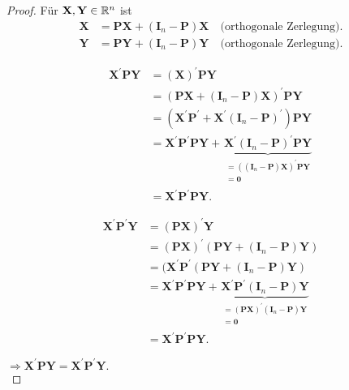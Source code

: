 \documentclass{tstextbook}
\begin{document}
\begin{proof}
	Für $ \mathbf{X},\mathbf{Y} \in \mathbb R^n $ ist 
	\[ \begin{aligned}
		\mathbf{X} & = \mathbf{P}\mathbf{X} + (\mathbf{I}_n - \mathbf{P})\mathbf{X} \quad \text{(orthogonale Zerlegung).} \\
		\mathbf{Y} & = \mathbf{P}\mathbf{Y} + (\mathbf{I}_n - \mathbf{P})\mathbf{Y} \quad \text{(orthogonale Zerlegung).}
	\end{aligned}	
	\]
	
	\[
	\begin{aligned}
		\mathbf{X}^\prime \mathbf{P}\mathbf{Y} & = (\mathbf{X})^\prime \mathbf{P}\mathbf{Y} \\
		& = (\mathbf{PX}+(\mathbf{I}_n-\mathbf{P})\mathbf{X})^\prime \mathbf{P}\mathbf{Y} \\
		& = (\mathbf{X}^\prime \mathbf{P}^\prime +\mathbf{X}^\prime(\mathbf{I}_n-\mathbf{P})^\prime)\mathbf{P}\mathbf{Y} \\
		& = \mathbf{X}^\prime \mathbf{P}^\prime \mathbf{P}\mathbf{Y} + \underbrace{\mathbf{X}^\prime (\mathbf{I}_n-\mathbf{P})^\prime \mathbf{PY}}_{\substack{=((\mathbf{I}_n-\mathbf{P})\mathbf{X})^\prime \mathbf{PY} \\ = \boldsymbol{0}}} \\
		& = \mathbf{X}^\prime \mathbf{P}^\prime \mathbf{PY}.
	\end{aligned}
	\]
	
	\[
	\begin{aligned}
		\mathbf{X}^\prime \mathbf{P}^\prime \mathbf{Y} & = (\mathbf{P}\mathbf{X})^\prime \mathbf{Y} \\
		& = (\mathbf{P}\mathbf{X})^\prime (\mathbf{P}\mathbf{Y} + (\mathbf{I}_n - \mathbf{P})\mathbf{Y}) \\
		& = (\mathbf{X}^\prime \mathbf{P}^\prime (\mathbf{P}\mathbf{Y} + (\mathbf{I}_n - \mathbf{P})\mathbf{Y})\\
		& = \mathbf{X}^\prime \mathbf{P}^\prime \mathbf{P}\mathbf{Y} + \underbrace{\mathbf{X}^\prime \mathbf{P}^\prime (\mathbf{I}_n-\mathbf{P})\mathbf{Y}}_{\substack{=(\mathbf{P}\mathbf{X})^\prime (\mathbf{I}_n-\mathbf{P})\mathbf{Y} \\ = \boldsymbol{0}}} \\
		& = \mathbf{X}^\prime \mathbf{P}^\prime \mathbf{P}\mathbf{Y}.
	\end{aligned}
	\] 
	
	$ \Rightarrow \mathbf{X}^\prime \mathbf{P}\mathbf{Y} = \mathbf{X}^\prime \mathbf{P}^\prime \mathbf{Y}. $  \\
	

\end{proof}
\end{document}
